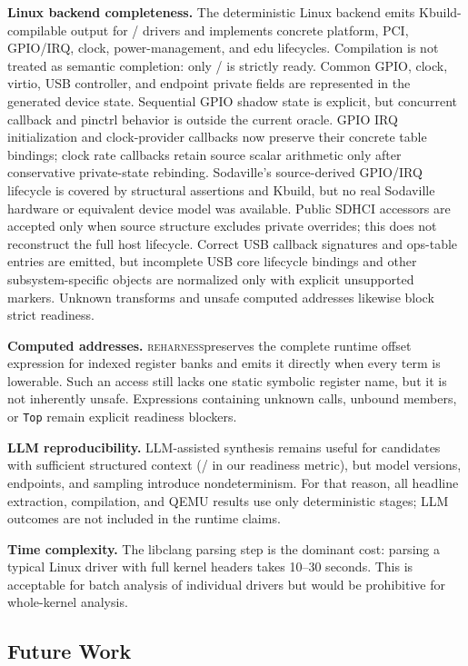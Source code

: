 \documentclass[sigconf,review]{acmart}
\newcommand{\reharness}{\textsc{reharness}}
\begin{document}
\textbf{Linux backend completeness.} The deterministic Linux backend emits Kbuild-compilable output for \LinuxCompileCount{}/\EvalDrivers{} drivers and implements concrete platform, PCI, GPIO/IRQ, clock, power-management, and edu lifecycles. Compilation is not treated as semantic completion: only \LinuxReadyCount{}/\EvalDrivers{} is strictly ready. Common GPIO, clock, virtio, USB controller, and endpoint private fields are represented in the generated device state. Sequential GPIO shadow state is explicit, but concurrent callback and pinctrl behavior is outside the current oracle. GPIO IRQ initialization and clock-provider callbacks now preserve their concrete table bindings; clock rate callbacks retain source scalar arithmetic only after conservative private-state rebinding. Sodaville's source-derived GPIO/IRQ lifecycle is covered by structural assertions and Kbuild, but no real Sodaville hardware or equivalent device model was available. Public SDHCI accessors are accepted only when source structure excludes private overrides; this does not reconstruct the full host lifecycle. Correct USB callback signatures and ops-table entries are emitted, but incomplete USB core lifecycle bindings and other subsystem-specific objects are normalized only with explicit unsupported markers. Unknown transforms and unsafe computed addresses likewise block strict readiness.

\textbf{Computed addresses.} \reharness preserves the complete runtime offset expression for indexed register banks and emits it directly when every term is lowerable. Such an access still lacks one static symbolic register name, but it is not inherently unsafe. Expressions containing unknown calls, unbound members, or \texttt{Top} remain explicit readiness blockers.

\textbf{LLM reproducibility.} LLM-assisted synthesis remains useful for candidates with sufficient structured context (\LLMReadyCount{}/\EvalDrivers{} in our readiness metric), but model versions, endpoints, and sampling introduce nondeterminism. For that reason, all headline extraction, compilation, and QEMU results use only deterministic stages; LLM outcomes are not included in the runtime claims.

\textbf{Time complexity.} The libclang parsing step is the dominant cost: parsing a typical Linux driver with full kernel headers takes 10--30 seconds. This is acceptable for batch analysis of individual drivers but would be prohibitive for whole-kernel analysis.

\subsection{Future Work}
\end{document}
